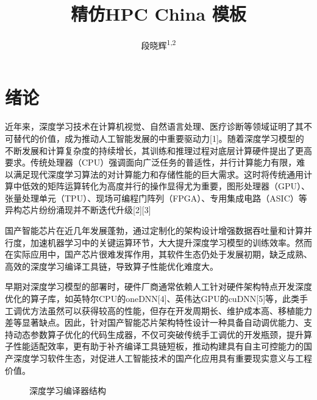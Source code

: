 \documentclass[a4paper, nosysfonts]{hpcchina}
\title{精仿HPC China \XeLaTeX 模板}
\author{段晓辉\textsuperscript{1,2}}
\affiliation{
  \textsuperscript{1} 清华大学，北京 100084
  
  \textsuperscript{2} 国家超级计算无锡中心，无锡 214072
}
\begin{document}
    \maketitle
    
    \section{绪论}
    近年来，深度学习技术在计算机视觉、自然语言处理、医疗诊断等领域证明了其不可替代的价值，成为推动人工智能发展的中重要驱动力[1]。随着深度学习模型的不断发展和计算复杂度的持续增长，其训练和推理过程对底层计算硬件提出了更高要求。传统处理器（CPU）强调面向广泛任务的普适性，并行计算能力有限，难以满足现代深度学习算法的对计算能力和存储性能的巨大需求。这时将传统通用计算中低效的矩阵运算转化为高度并行的操作显得尤为重要，图形处理器（GPU）、张量处理单元（TPU）、现场可编程门阵列（FPGA）、专用集成电路（ASIC）等异构芯片纷纷涌现并不断迭代升级[2][3]


    国产智能芯片在近几年发展蓬勃，通过定制化的架构设计增强数据吞吐量和计算并行度，加速机器学习中的关键运算环节，大大提升深度学习模型的训练效率。然而在实际应用中，国产芯片很难发挥作用，其软件生态仍处于发展初期，缺乏成熟、高效的深度学习编译工具链，导致算子性能优化难度大。


    早期对深度学习模型的部署时，硬件厂商通常依赖人工针对硬件架构特点开发深度优化的算子库，如英特尔CPU的oneDNN[4]、英伟达GPU的cuDNN[5]等，此类手工调优方法虽然可以获得较高的性能，但存在开发周期长、维护成本高、移植能力差等显著缺点。因此，针对国产智能芯片架构特性设计一种具备自动调优能力、支持动态参数算子优化的代码生成器，不仅可突破传统手工调优的开发瓶颈，提升算子性能适配效率，更有助于补齐编译工具链短板，推动构建具有自主可控能力的国产深度学习软件生态，对促进人工智能技术的国产化应用具有重要现实意义与工程价值。

  \begin{figure}[!htbp]
  \centering
  \caption{深度学习编译器结构
  }
\end{figure}
\end{document}
